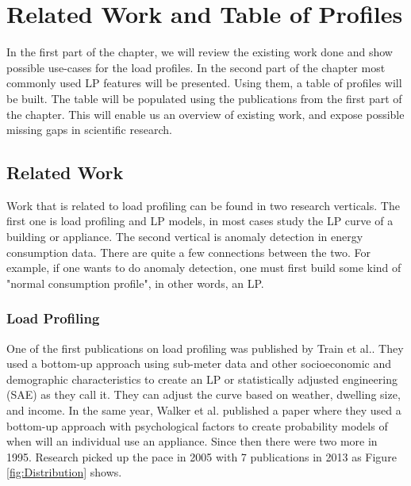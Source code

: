 \chapter{Related Work and Table of Profiles}
\label{chapter2}

In the first part of the chapter, we will review the existing work done and show possible use-cases for the load profiles.  
In the second part of the chapter most commonly used LP features will be presented. 
Using them, a table of profiles will be built. 
The table will be populated using the publications from the first part of the chapter.
This will enable us an overview of existing work, and expose possible missing gaps in scientific research.

\section{Related Work}
\label{sec:related_work}
Work that is related to load profiling can be found in two research verticals. 
The first one is load profiling and LP models, in most cases study the LP curve of a building or appliance.
The second vertical is anomaly detection in energy consumption data. There are quite a few connections between the two. 
For example, if one wants to do anomaly detection, one must first build some kind of "normal consumption profile", in other words, an LP.

\subsection{Load Profiling}

One of the first publications on load profiling was published by Train et al.\cite{TRAIN19851103}.
They used a bottom-up approach using sub-meter data and other socioeconomic and demographic characteristics 
to create an LP or statistically adjusted engineering (SAE) as they call it.
They can adjust the curve based on weather, dwelling size, and income. 
In the same year, Walker et al.\cite{WALKER1985} published a paper where they used a bottom-up approach with psychological factors to create probability models of when will an individual use an appliance.
Since then there were two more in 1995. Research picked up the pace in 2005 with 7 publications in 2013 as Figure \ref{fig:Distribution} shows.

